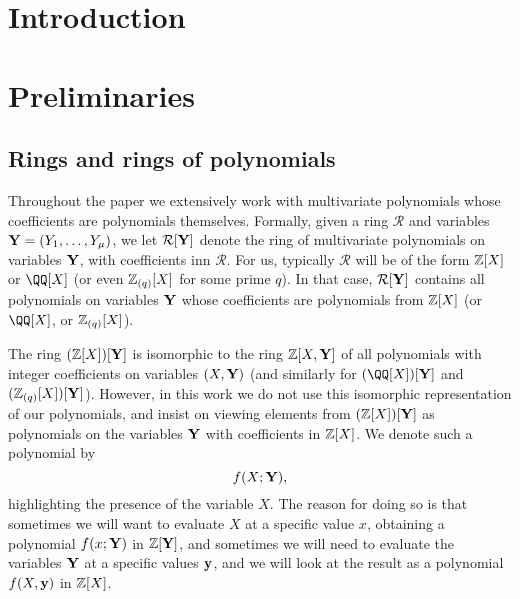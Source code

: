 \documentclass[11pt,letterpaper,usenames,dvipsnames]{article}
\title{\stylizedtitle}
\author{
	Albert Garreta, Psi Vesely, Arantxa Zapico
}
\date{\today}
\begin{document}
\maketitle

\begin{abstract}
\end{abstract}

\setcounter{tocdepth}{3}
\begin{spacing}{0.8}
{\footnotesize \tableofcontents}
\end{spacing}
\newcommand{\cR}{\mathcal{R}}

\section{Introduction}


\section{Preliminaries}

        

\subsection{Rings and rings of polynomials} Throughout the paper we extensively work with multivariate polynomials whose coefficients are polynomials themselves. Formally, given a ring $\cR$ and variables $\mathbf{Y}=(Y_1,\ldots, Y_\mu)$, we let $\cR[\YY]$ denote the ring of multivariate polynomials on variables $\mathbf{Y}$, with coefficients inn $\cR$. For us, typically $\cR$ will be of the form $\mathbb{Z}[X]$ or $\QQ[X]$ (or even $\mathbb{Z}_{(q)}[X]$ for some prime $q$). In that case, $\cR[\YY]$ contains all polynomials on variables $\mathbf{Y}$ whose coefficients are polynomials from $\mathbb{Z}[X]$ (or $\QQ[X]$, or $\mathbb{Z}_{(q)}[X]$). 

The ring $(\mathbb{Z}[X])[\mathbf{Y}]$ is isomorphic to the ring $\mathbb{Z}[X, \mathbf{Y}]$ of all polynomials with integer coefficients on variables $(X,\mathbf{Y})$  (and similarly for $(\QQ[X])[\YY]$ and $(\mathbb{Z}_{(q)}[X])[\mathbf{Y}]$). However, in this work we do not use this isomorphic representation of our polynomials, and insist on viewing elements from $(\mathbb{Z}[X])[\mathbf{Y}]$ as polynomials on the variables $\mathbf{Y}$ with coefficients in $\mathbb{Z}[X]$. We denote such a polynomial by $$f(X;\mathbf{Y}),$$
highlighting the presence of the variable $X$. The reason for doing so is that sometimes we will want to evaluate $X$ at a specific value $x$, obtaining a polynomial $f(x;\mathbf{Y})$ in $\mathbb{Z}[\mathbf{Y}]$, and sometimes we will need to evaluate the variables $\mathbf{Y}$ at a specific values $\mathbf{y}$, and we will look at the result as  a polynomial $f(X,\mathbf{y})$ in $\mathbb{Z}[X]$. 
\end{document}

